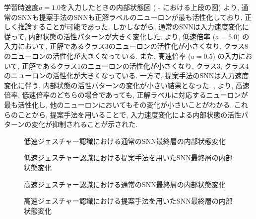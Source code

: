 学習時速度$a=1.0$を入力したときの内部状態図 ( - における上段の図) より, 通常のSNNも提案手法のSNNも正解ラベルのニューロンが最も活性化しており, 正しく推論することが可能であった.
しかしながら, 通常のSNNは入力速度変化に従って, 内部状態の活性パターンが大きく変化した.
より, 低速倍率 ($a=5.0$) の入力において, 正解であるクラス3のニューロンの活性化が小さくなり, クラス8のニューロンの活性化が大きくなっている.
また, 高速倍率 ($a=0.5$) の入力において, 正解であるクラス1のニューロンの活性化が小さくなり, クラス3, クラス4のニューロンの活性化が大きくなっている.
一方で, 提案手法のSNNは入力速度変化に伴う, 内部状態の活性パターンの変化が小さい結果となった.
, より, 高速倍率, 低速倍率のどちらの場合であっても, 正解ラベルに対応するニューロンが最も活性化し, 他のニューロンにおいてもその変化が小さいことがわかる.
これらのことから, 提案手法を用いることで, 入力速度変化による内部状態の活性パターンの変化が抑制されることが示された.
\begin{figure}[htbp] %
    \centering
    
    \caption{
        低速ジェスチャー認識における通常のSNN最終層の内部状態変化
        }
    \label{fig:discussion2:snn:a5}
\end{figure}

\begin{figure}[htbp] %
    \centering
    
    \caption{
        低速ジェスチャー認識における提案手法を用いたSNN最終層の内部状態変化
        }
    \label{fig:discussion2:dyna:a5}
\end{figure}

\begin{figure}[htbp] %
    \centering
    
    \caption{
        高速ジェスチャー認識における通常のSNN最終層の内部状態変化
        }
    \label{fig:discussion2:snn:a05}
\end{figure}

\begin{figure}[htbp] %
    \centering
    
    \caption{
        高速ジェスチャー認識における提案手法を用いたSNN最終層の内部状態変化
        }
    \label{fig:discussion2:dyna:a05}
\end{figure}


